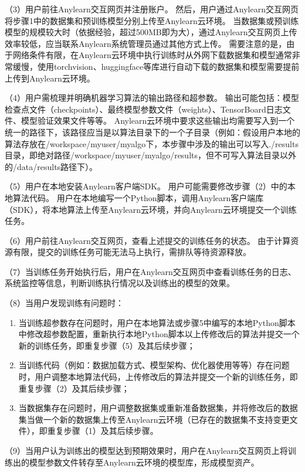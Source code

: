 （3）用户前往Anylearn交互网页并注册账户。
然后，用户通过Anylearn交互网页将步骤1中的数据集和预训练模型分别上传至Anylearn云环境。
当数据集或预训练模型的规模较大时（依据经验，超过500MB即为大），通过Anylearn交互网页上传效率较低，应当联系Anylearn系统管理员通过其他方式上传。
需要注意的是，由于网络条件有限，在Anylearn云环境中执行训练时从外网下载数据集和模型通常非常缓慢，使用torchvision、huggingface等库进行自动下载的数据集和模型需要提前上传到Anylearn云环境。

（4）用户需梳理并明确机器学习算法的输出路径和超参数。
输出可能包括：模型检查点文件（checkpoints）、最终模型参数文件（weights）、TensorBoard日志文件、模型验证效果文件等等。
Anylearn云环境中要求这些输出均需要写入到一个统一的路径下，该路径应当是以算法目录下的一个子目录（例如：假设用户本地的算法存放在/workspace/myuser/myalgo下，本步骤中涉及的输出可以写入./results目录，即绝对路径/workspace/myuser/myalgo/results，但不可写入算法目录以外的/data/results路径下）。

（5）用户在本地安装Anylearn客户端SDK。
用户可能需要修改步骤（2）中的本地算法代码。
用户在本地编写一个Python脚本，调用Anylearn客户端库（SDK），将本地算法上传至Anylearn云环境，并向Anylearn云环境提交一个训练任务。

（6）用户前往Anylearn交互网页，查看上述提交的训练任务的状态。
由于计算资源有限，提交的训练任务可能无法马上执行，需排队等待资源释放。

（7）当训练任务开始执行后，用户在Anylearn交互网页中查看训练任务的日志、系统监控等信息，判断训练执行情况以及训练出的模型的效果。

（8）当用户发现训练有问题时：
\begin{enumerate}
  \item 当训练超参数存在问题时，用户在本地算法或步骤5中编写的本地Python脚本中修改超参数配置，重新执行本地Python脚本以上传修改后的算法并提交一个新的训练任务，即重复步骤（5）及其后续步骤；
  \item 当训练代码（例如：数据加载方式、模型架构、优化器使用等等）存在问题时，用户调整本地算法代码，上传修改后的算法并提交一个新的训练任务，即重复步骤（2）及其后续步骤；
  \item 当数据集存在问题时，用户调整数据集或重新准备数据集，并将修改后的数据集当做一个新的数据集上传至Anylearn云环境（已存在的数据集不支持变更文件），即重复步骤（1）及其后续步骤。
\end{enumerate}

（9）当用户认为训练出的模型达到预期效果时，用户在Anylearn交互网页上将训练出的模型参数文件转存至Anylearn云环境的模型库，形成模型资产。

